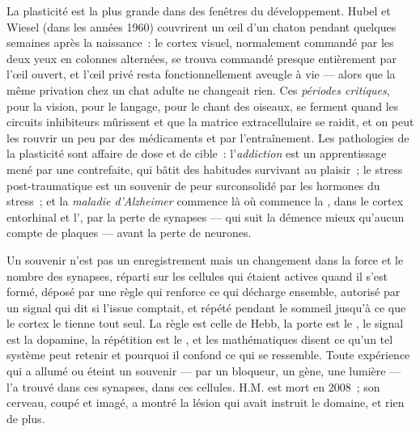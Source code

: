 \begin{definition}\label{def:b3:learning-memory:critical}
La plasticité est la plus grande dans des fenêtres du développement.
Hubel et Wiesel (dans les années 1960) couvrirent un œil d'un chaton
pendant quelques semaines après la naissance~: le cortex visuel,
normalement commandé par les deux yeux en colonnes alternées, se trouva
commandé presque entièrement par l'œil ouvert, et l'œil privé resta
fonctionnellement aveugle à vie --- alors que la même privation chez un
chat adulte ne changeait rien. Ces \emph{périodes critiques}, pour la
vision, pour le langage, pour le chant des oiseaux, se ferment quand les
circuits inhibiteurs mûrissent et que la matrice extracellulaire se
raidit, et on peut les rouvrir un peu par des médicaments et par
l'entraînement. Les pathologies de la plasticité sont affaire de dose et
de cible~: l'\emph{addiction} est un apprentissage mené par une  contrefaite, qui bâtit des habitudes survivant au
plaisir~; le stress post-traumatique est un souvenir de peur
surconsolidé par les hormones du stress~; et la \emph{maladie
d'Alzheimer} commence là où commence la , dans le
cortex entorhinal et l', par la perte de synapses --- qui suit
la démence mieux qu'aucun compte de plaques --- avant la perte de
neurones.
\end{definition}

\begin{remark}\label{rem:b3:learning-memory:what}
Un souvenir n'est pas un enregistrement mais un changement dans la force
et le nombre des synapses, réparti sur les cellules qui étaient actives
quand il s'est formé, déposé par une règle qui renforce ce qui décharge
ensemble, autorisé par un signal qui dit si l'issue comptait, et répété
pendant le sommeil jusqu'à ce que le cortex le tienne tout seul. La
règle est celle de Hebb, la porte est le , le signal est
la dopamine, la répétition est le , et les mathématiques disent ce
qu'un tel système peut retenir et pourquoi il confond ce qui se
ressemble. Toute expérience qui a allumé ou éteint un souvenir --- par
un bloqueur, un gène, une lumière --- l'a trouvé dans ces synapses, dans
ces cellules. H.M. est mort en 2008~; son cerveau, coupé et imagé, a
montré la lésion qui avait instruit le domaine, et rien de plus.
\end{remark}

